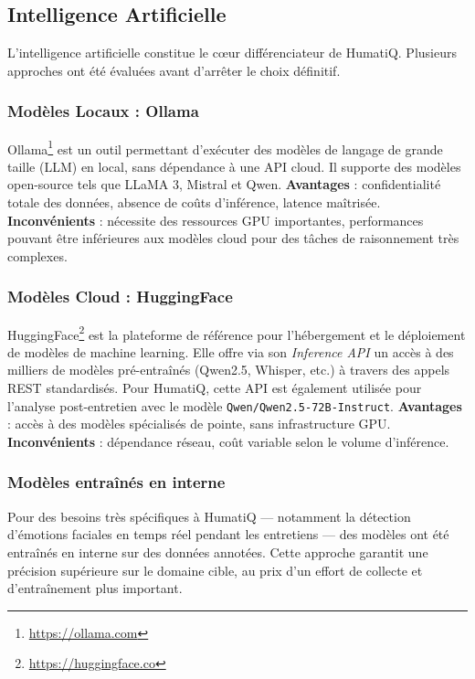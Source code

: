 \subsection{Intelligence Artificielle}
L'intelligence artificielle constitue le cœur différenciateur de HumatiQ. Plusieurs approches ont été évaluées avant d'arrêter le choix définitif.
\subsubsection{Modèles Locaux : Ollama}
Ollama\footnote{\url{https://ollama.com}} est un outil permettant d'exécuter des modèles de langage de grande taille (LLM) en local, sans dépendance à une API cloud. Il supporte des modèles open-source tels que LLaMA 3, Mistral et Qwen.
\noindent \textbf{Avantages} : confidentialité totale des données, absence de coûts d'inférence, latence maîtrisée.\\
\noindent \textbf{Inconvénients} : nécessite des ressources GPU importantes, performances pouvant être inférieures aux modèles cloud pour des tâches de raisonnement très complexes.
\subsubsection{Modèles Cloud : HuggingFace}
HuggingFace\footnote{\url{https://huggingface.co}} est la plateforme de référence pour l'hébergement et le déploiement de modèles de machine learning. Elle offre via son \textit{Inference API} un accès à des milliers de modèles pré-entraînés (Qwen2.5, Whisper, etc.) à travers des appels REST standardisés. Pour HumatiQ, cette API est également utilisée pour l'analyse post-entretien avec le modèle \texttt{Qwen/Qwen2.5-72B-Instruct}.
\noindent \textbf{Avantages} : accès à des modèles spécialisés de pointe, sans infrastructure GPU.\\
\noindent \textbf{Inconvénients} : dépendance réseau, coût variable selon le volume d'inférence.
\subsubsection{Modèles entraînés en interne}
Pour des besoins très spécifiques à HumatiQ — notamment la détection d'émotions faciales en temps réel pendant les entretiens — des modèles ont été entraînés en interne sur des données annotées. Cette approche garantit une précision supérieure sur le domaine cible, au prix d'un effort de collecte et d'entraînement plus important.
